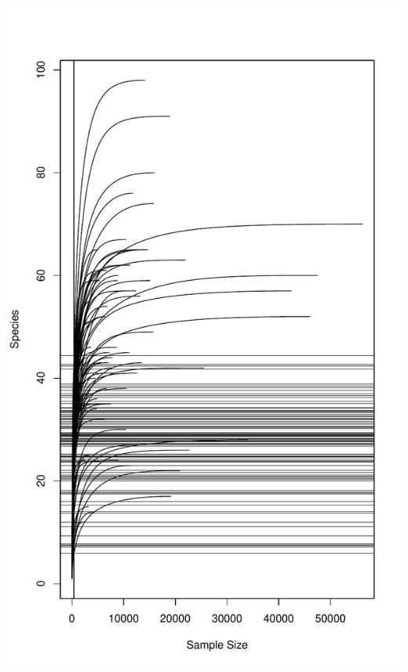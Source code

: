 \documentclass[
]{article}
\begin{document}
\includegraphics[width=1\linewidth]{manuscript_template_files/figure-latex/unnamed-chunk-24-5}
\end{document}
